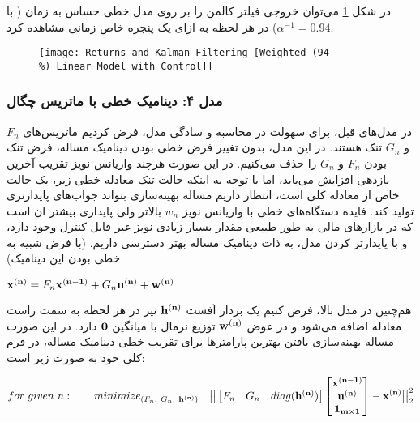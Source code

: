 \documentclass{scribe-cgenomics}
\begin{document}
\begin{نتیجه}
در شکل
\ref{kalman_2}
 می‌توان خروجی فیلتر کالمن را بر روی مدل خطی حساس به زمان ( با
$\alpha^{-1} = 0.94$)
در هر لحظه به ازای یک پنجره خاص زمانی مشاهده کرد.

\begin{figure}[H]\label{kalman_2}
\texttt{[image: Returns and Kalman Filtering [Weighted (94\\\%) Linear Model with Control]]}
\centering
\end{figure}
\end{نتیجه}





\subsubsection{مدل ۴: دینامیک خطی با ماتریس چگال}
در مدل‌های قبل، برای سهولت در محاسبه و سادگی مدل، فرض کردیم ماتریس‌های
$F_n$
و
$G_n$
تنک هستند. در این مدل، بدون تغییر فرض خطی بودن دینامیک مساله، فرض تنک بودن
$F_n$
و
$G_n$
را حذف می‌کنیم. در این صورت هرچند واریانس نویز تقریب آخرین بازدهی افزایش می‌یابد، اما با توجه به اینکه حالت تنک معادله خطی زیر، یک حالت خاص از معادله کلی است، انتظار داریم مساله بهینه‌سازی بتواند جواب‌های پایدارتری تولید کند. فایده دستگاه‌های خطی با واریانس نویز
$w_n$
بالاتر ولی پایداری بیشتر ان است که در بازارهای مالی به طور طبیعی مقدار بسیار زیادی نویز غیر قابل کنترل وجود دارد، و با پایدارتر کردن مدل، به ذات دینامیک مساله بهتر دسترسی داریم. (با فرض شبیه به خطی بودن این دینامیک)

\begin{center}
$
\bold{x^{(n)}} = F_n\bold{x^{(n-1)}} + G_n\bold{u^{(n)}} + \bold{w^{(n)}}
$
\end{center}

هم‌چنین در مدل بالا، فرض کنیم یک بردار آفست
$\bold{h^{(n)}}$
نیز در هر لحظه به سمت راست معادله اضافه می‌شود و در عوض
$\bold{w^{(n)}}$
توزیع نرمال با میانگین
$\bold{0}$
دارد. در این صورت مساله بهینه‌سازی یافتن بهترین پارامترها برای تقریب خطی دینامیک مساله، در فرم کلی خود به صورت زیر است:

\begin{equation}
for\ given\ n:\qquad minimize_{(F_n,\ G_n,\ \bold{h^{(n)}})}\quad \big| \big|
\begin{bmatrix}
F_n & G_n & diag(\bold{h^{(n)}})
\end{bmatrix}
\begin{bmatrix}
\bold{x^{(n-1)}} \\
\bold{u^{(n)}} \\
\bold{1_{m\times 1}}
\end{bmatrix}
- \bold{x^{(n)}}\big|\big|_{2}^{2}
\end{equation}
\end{document}

